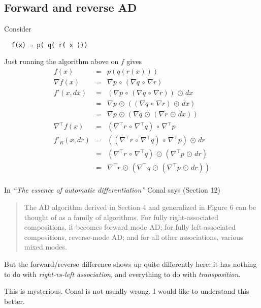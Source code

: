 \documentclass[sigplan,review]{acmart}
\newcommand{\gradf}[1]{\nabla\! #1}  %
\newcommand{\gradft}[1]{\nabla^{\top}\!#1}  %
\newcommand{\fwdDf}[1]{f'}  %
\newcommand{\revDf}[1]{f'_R}  %
\newcommand{\lmcomp}{\,\circ\,}   %
\newcommand{\lmapply}{\,\odot\,}      %
\newcommand{\tom}[1]{}
\begin{document}
\subsection{Forward and reverse AD}

Consider
\begin{lstlisting}
  f(x) = p( q( r( x )))
\end{lstlisting}
Just running the algorithm above on $f$ gives
$$
\begin{array}{rcl}
  f(x)  & = & p( q( r( x ))) \\
  \gradf{f}(x) & = & \gradf{p} \lmcomp (\gradf{q} \lmcomp \gradf{r}) \\
  \fwdDf{f}(x,dx) & = & (\gradf{p} \lmcomp (\gradf{q} \lmcomp \gradf{r})) \lmapply dx \\
  & = & \gradf{p} \lmapply ((\gradf{q} \lmcomp \gradf{r}) \lmapply dx) \\
  & = & \gradf{p} \lmapply (\gradf{q} \lmapply (\gradf{r} \lmapply dx)) \\
  \gradft{f}(x) & = & (\gradft{r} \lmcomp \gradft{q}) \lmcomp \gradft{p} \\
  \revDf{f}(x,dr) & = & ((\gradft{r} \lmcomp \gradft{q}) \lmcomp \gradft{p}) \lmapply dr \\
     & = & (\gradft{r} \lmcomp \gradft{q}) \lmapply (\gradft{p} \lmapply dr) \\
     & = & \gradft{r} \lmapply (\gradft{q} \lmapply (\gradft{p} \lmapply dr)) \\
\end{array}
$$

In \emph{``The essence of automatic differentiation''} Conal says (Section 12)
\begin{quote}
The AD algorithm derived in Section 4 and generalized in Figure 6 can be thought of as a family
of algorithms. For fully right-associated compositions, it becomes forward mode AD; for fully
left-associated compositions, reverse-mode AD; and for all other associations, various mixed modes.
\end{quote}
But the forward/reverse difference shows up quite differently here: it has nothing to do
with \emph{right-vs-left association}, and everything to do with \emph{transposition}.

This is mysterious.  Conal is not usually wrong.  I would like to
understand this better.
\tom{I was also puzzled by this.  Conal's claim is suspicious to me,
  but firstly it's very cool and secondly it's Conal, so I want it to
  be true and I still hope it is.}
\end{document}
